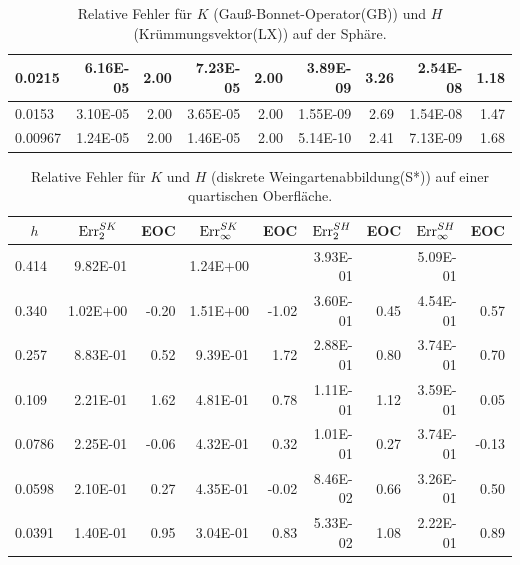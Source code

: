 \begin{table}[htbp]
\begin{tabular}{|l|r|r|r|r|r|r|r|r|}
            0.0215 & 6.16E-05 & 2.00 & 7.23E-05 & 2.00 & 3.89E-09 & 3.26 & 2.54E-08 & 1.18 \\ \hline
            0.0153 & 3.10E-05 & 2.00 & 3.65E-05 & 2.00 & 1.55E-09 & 2.69 & 1.54E-08 & 1.47 \\ \hline
            0.00967 & 1.24E-05 & 2.00 & 1.46E-05 & 2.00 & 5.14E-10 & 2.41 & 7.13E-09 & 1.68 \\ \hline
      \end{tabular}
      \caption[Gauß-Bonnet und Krümmungsvektor auf der Sphäre]{Relative Fehler für \( K \) (Gauß-Bonnet-Operator(GB)) und \( H \)
      (Krümmungsvektor(LX)) auf der Sphäre.}
      \label{tabSphereGBLX}
   \end{table}

   \begin{table}[htbp]
    \centering
      \begin{tabular}{|l|r|r|r|r|r|r|r|r|}
      \hline
      \multicolumn{1}{|c|}{\rule{0pt}{11pt}\( h \)} & \multicolumn{1}{c|}{\( \text{Err}_{2}^{SK} \)} & \multicolumn{1}{c|}{EOC} & 
           \multicolumn{1}{c|}{\( \text{Err}_{\infty}^{SK} \)} & \multicolumn{1}{c|}{EOC} & \multicolumn{1}{c|}{\( \text{Err}_{2}^{SH} \)} &
           \multicolumn{1}{c|}{EOC} & \multicolumn{1}{c|}{\( \text{Err}_{\infty}^{SH} \)} & \multicolumn{1}{c|}{EOC} \\ \hline
           0.414 & 9.82E-01 & \multicolumn{1}{l|}{} & 1.24E+00 & \multicolumn{1}{l|}{} & 3.93E-01 & \multicolumn{1}{l|}{} & 5.09E-01 & \multicolumn{1}{l|}{} \\ \hline
            0.340 & 1.02E+00 & -0.20 & 1.51E+00 & -1.02 & 3.60E-01 & 0.45 & 4.54E-01 & 0.57 \\ \hline
            0.257 & 8.83E-01 & 0.52 & 9.39E-01 & 1.72 & 2.88E-01 & 0.80 & 3.74E-01 & 0.70 \\ \hline
            0.109 & 2.21E-01 & 1.62 & 4.81E-01 & 0.78 & 1.11E-01 & 1.12 & 3.59E-01 & 0.05 \\ \hline
            0.0786 & 2.25E-01 & -0.06 & 4.32E-01 & 0.32 & 1.01E-01 & 0.27 & 3.74E-01 & -0.13 \\ \hline
            0.0598 & 2.10E-01 & 0.27 & 4.35E-01 & -0.02 & 8.46E-02 & 0.66 & 3.26E-01 & 0.50 \\ \hline
            0.0391 & 1.40E-01 & 0.95 & 3.04E-01 & 0.83 & 5.33E-02 & 1.08 & 2.22E-01 & 0.89 \\ \hline
      \end{tabular}
      \caption[Weingarten auf einer quartischen Oberfläche (S*)]{Relative Fehler für \( K \) und \( H \) (diskrete Weingartenabbildung(S*)) auf einer quartischen Oberfläche.}

\end{table}
